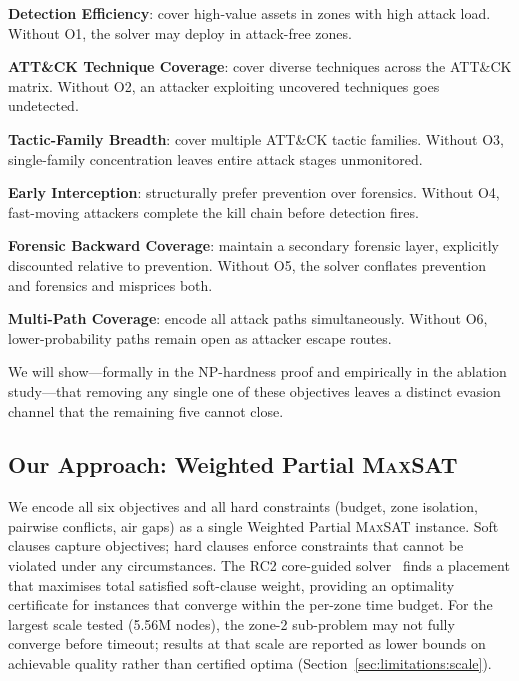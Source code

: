\documentclass[journal]{IEEEtran}
\newcommand{\MAXSAT}{\textsc{MaxSAT}}
\begin{document}
\begin{description}[leftmargin=!, labelwidth=\widthof{\textbf{O6.}}]
  \item[\textbf{O1.}] \textbf{Detection Efficiency}: cover
    high-value assets in zones with high attack load. Without O1,
    the solver may deploy in attack-free zones.
  \item[\textbf{O2.}] \textbf{ATT\&CK Technique Coverage}: cover
    diverse techniques across the ATT\&CK matrix. Without O2, an
    attacker exploiting uncovered techniques goes undetected.
  \item[\textbf{O3.}] \textbf{Tactic-Family Breadth}: cover multiple
    ATT\&CK tactic families. Without O3, single-family concentration
    leaves entire attack stages unmonitored.
  \item[\textbf{O4.}] \textbf{Early Interception}: structurally prefer
    prevention over forensics. Without O4, fast-moving attackers
    complete the kill chain before detection fires.
  \item[\textbf{O5.}] \textbf{Forensic Backward Coverage}: maintain a
    secondary forensic layer, explicitly discounted relative to
    prevention. Without O5, the solver conflates prevention and
    forensics and misprices both.
  \item[\textbf{O6.}] \textbf{Multi-Path Coverage}: encode all attack
    paths simultaneously. Without O6, lower-probability paths remain
    open as attacker escape routes.
\end{description}

We will show---formally in the NP-hardness proof and empirically in
the ablation study---that removing any single one of these objectives
leaves a distinct evasion channel that the remaining five cannot close.

\subsection{Our Approach: Weighted Partial \MAXSAT{}}
\label{sec:intro:approach}

We encode all six objectives and all hard constraints (budget, zone
isolation, pairwise conflicts, air gaps) as a single Weighted Partial
\MAXSAT{} instance. Soft clauses capture objectives; hard clauses
enforce constraints that cannot be violated under any circumstances.
The RC2 core-guided solver~\cite{rc2} finds a placement that
maximises total satisfied soft-clause weight, providing an optimality
certificate for instances that converge within the per-zone time
budget. For the largest scale tested (5.56M nodes), the zone-2
sub-problem may not fully converge before timeout; results at that
scale are reported as lower bounds on achievable quality rather than
certified optima (Section~\ref{sec:limitations:scale}).
\end{document}
